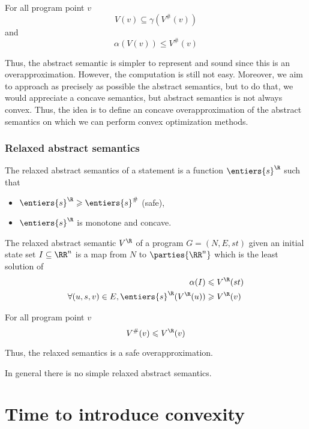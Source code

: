 \documentclass[a4paper, twoside, 10pt]{article}
\begin{document}
\begin{lemma}
    For all program point $v$
    \[
        V(v) \subseteq \gamma(V^\#(v))    
    \]
    and
    \[
        \alpha(V(v)) \leqslant V^\#(v)
    \]
\end{lemma}

Thus, the abstract semantic is simpler to represent and sound since this is an overapproximation. However, the computation is still not easy. Moreover, we aim to approach as precisely as possible the abstract semantics, but to do that, we would appreciate a concave semantics, but abstract semantics is not always convex. Thus, the idea is to define an concave overapproximation of the abstract semantics on which we can perform convex optimization methods.

\subsubsection{Relaxed abstract semantics}

The relaxed abstract semantics of a statement is a function $\entiers{s}^\R$ such that
\begin{itemize}
    \item $\entiers{s}^\R \geqslant \entiers{s}^\#$ (safe),
    \item $\entiers{s}^\R$ is monotone and concave.
\end{itemize}

The relaxed abstract semantic $V^\R$ of a program $G=(N,E,st)$ given an initial state set $I \subseteq\RR^n$ is a map from $N$ to $\parties{\RR^n}$ which is the least solution of
\[
    \begin{aligned}
        \alpha(I) &\leqslant V^\R(st)\\
        \forall (u,s,v) \in E, \entiers{s}^\R(V^\R(u)) &\geqslant V^\R(v)
    \end{aligned}
\]

\begin{lemma}
    For all program point $v$
    \[
        V^\#(v) \leqslant V^\R(v)
    \]
\end{lemma}

Thus, the relaxed semantics is a safe overapproximation.

In general there is no simple relaxed abstract semantics.

\section{Time to introduce convexity}
\end{document}
